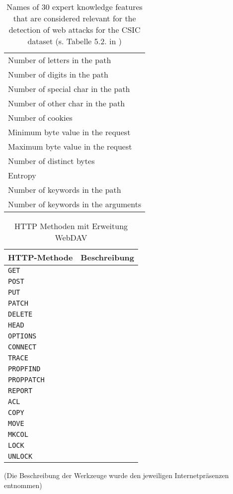 \begin{table}[h]
\begin{tabular}{|l|}
    Number of letters in the path\\
    Number of digits in the path\\
    Number of special char in the path\\
    Number of other char in the path\\
    Number of cookies\\
    Minimum byte value in the request\\
    Maximum byte value in the request\\
    Number of distinct bytes\\
    Entropy\\
    Number of keywords in the path\\
    Number of keywords in the arguments\\
    \hline
  \end{tabular}
  \caption{Names of 30 expert knowledge features that are considered relevant for the detection of web attacks for the CSIC dataset (s. Tabelle 5.2. in \cite{Giménez2015})}
  \label{tab:tgfeatures}
\end{table}

\begin{table}[h]
  \centering
  \begin{tabular}{|l | p{7cm} |}
    \hline
    \textbf{HTTP-Methode} & \textbf{Beschreibung} \\
    \hline
    \verb=GET= &  \\
    \verb=POST= & \\
    \verb=PUT= & \\
    \verb=PATCH= & \\
    \verb=DELETE= & \\
    \verb=HEAD= & \\
    \verb=OPTIONS= & \\
    \verb=CONNECT= & \\
    \verb=TRACE= & \\
    \verb=PROPFIND= & \\
    \verb=PROPPATCH= &  \\
    \verb=REPORT= & \\
    \verb=ACL= & \\
    \verb=COPY= & \\
    \verb=MOVE= & \\
    \verb=MKCOL= & \\
    \verb=LOCK= & \\
    \verb=UNLOCK= & \\
    \hline
  \end{tabular}
  
  \caption{HTTP Methoden mit Erweitung WebDAV}
  \medskip
  \small
  (Die Beschreibung der Werkzeuge wurde den jeweiligen Internetpräsenzen entnommen)
  \label{tab:httpmethods}
\end{table}
